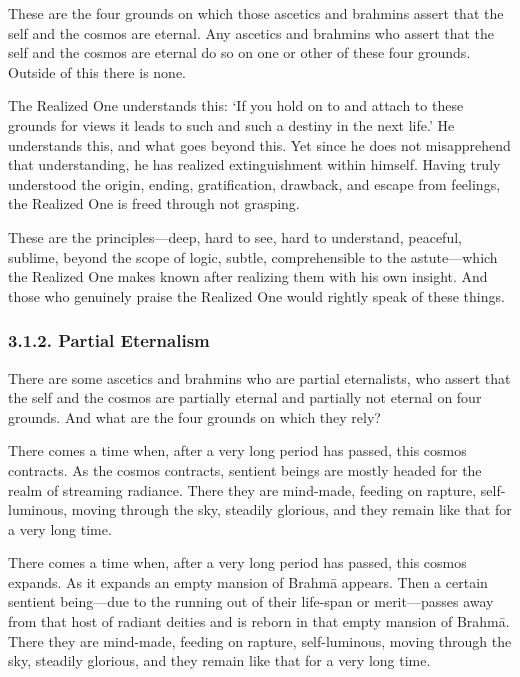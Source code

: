 \documentclass[12pt,openany]{book}%
\begin{document}
These are the four grounds on which those ascetics and brahmins assert that the self and the cosmos are eternal. Any ascetics and brahmins who assert that the self and the cosmos are eternal do so on one or other of these four grounds. Outside of this there is none. 

The Realized One understands this: ‘If you hold on to and attach to these grounds for views it leads to such and such a destiny in the next life.’ He understands this, and what goes beyond this. Yet since he does not misapprehend that understanding, he has realized extinguishment within himself. Having truly understood the origin, ending, gratification, drawback, and escape from feelings, the Realized One is freed through not grasping. 

These are the principles—deep, hard to see, hard to understand, peaceful, sublime, beyond the scope of logic, subtle, comprehensible to the astute—which the Realized One makes known after realizing them with his own insight. And those who genuinely praise the Realized One would rightly speak of these things. 

\subsubsection*{3.1.2. Partial Eternalism }

There are some ascetics and brahmins who are partial eternalists, who assert that the self and the cosmos are partially eternal and partially not eternal on four grounds. And what are the four grounds on which they rely? 

There comes a time when, after a very long period has passed, this cosmos contracts. As the cosmos contracts, sentient beings are mostly headed for the realm of streaming radiance. There they are mind-made, feeding on rapture, self-luminous, moving through the sky, steadily glorious, and they remain like that for a very long time. 

There comes a time when, after a very long period has passed, this cosmos expands. As it expands an empty mansion of \textsanskrit{Brahmā} appears. Then a certain sentient being—due to the running out of their life-span or merit—passes away from that host of radiant deities and is reborn in that empty mansion of \textsanskrit{Brahmā}. There they are mind-made, feeding on rapture, self-luminous, moving through the sky, steadily glorious, and they remain like that for a very long time. 
\end{document}
